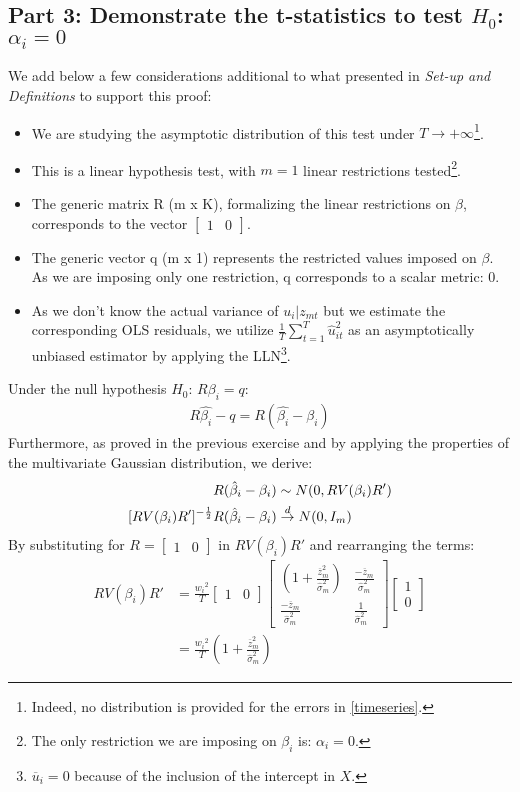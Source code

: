 \documentclass[]{article}
\begin{document}
\subsection{Part 3: Demonstrate the t-statistics to test $H_0$: $\alpha_i = 0 $}
We add below a few considerations additional to what presented in \textit{Set-up and Definitions} to support this proof:
\begin{itemize}
	\item We are studying the asymptotic distribution of this test under $T \to +\infty$\footnote{Indeed, no distribution is provided for the errors in \ref{timeseries}.}.	
	\item This is a linear hypothesis test, with $m = 1$ linear restrictions tested\footnote{The only restriction we are imposing on $\beta_i$ is: $\alpha_i = 0 $.}.
	\item The generic matrix R (m x K), formalizing the linear restrictions on $\beta$, corresponds to the vector $\begin{bmatrix} 1 & 0 \end{bmatrix}$.
	\item The generic vector q (m x 1) represents the restricted values imposed on $\beta$. As we are imposing only one restriction, q corresponds to a scalar metric: 0.
	\item As we don't know the actual variance of $u_i|z_{mt}$ but we estimate the corresponding OLS residuals, we utilize $\frac{1}{T}\sum_{t=1}^{T}\hat{u}_{it}^2$ as an asymptotically unbiased estimator by applying the LLN\footnote{$\overline{u}_i = 0$ because of the inclusion of the intercept in $X$.}.
\end{itemize}
Under the null hypothesis $H_0$: $R\beta_i=q$:
\begin{align*}
	R\hat{\beta_i}-q = R(\hat{\beta_i} - \beta_i)
\end{align*}
Furthermore, as proved in the previous exercise and by applying the properties of the multivariate Gaussian distribution, we derive:
\begin{align} \label{2.3}
	R(\hat{\beta}_i-\beta_i) &\sim N(0, RV(\beta_i)R') \notag \\
	[RV(\beta_i)R']^{-\frac{1}{2}}R(\hat{\beta}_i-\beta_i) &\overset{d}{\to} N(0,I_m)
\end{align}
By substituting for $R=\begin{bmatrix} 1 & 0 \end{bmatrix}$ in $RV(\beta_i)R'$ and rearranging the terms:
\begin{align*}
	RV(\beta_i)R' &= \frac{w_i{^2}}{T} \begin{bmatrix} 1 & 0 \end{bmatrix} \begin{bmatrix} (1 + \frac{\overline{z}_m^2}{\hat{\sigma}_{m}^2}) & \frac{-\overline{z}_m}{\hat{\sigma}_{m}^2} \\ \frac{-\overline{z}_m}{\hat{\sigma}_{m}^2} & \frac{1}{\hat{\sigma}_{m}^2} \end{bmatrix} \begin{bmatrix} 1 \\ 0 \end{bmatrix} \\
	&= \frac{w_i{^2}}{T}(1 + \frac{\overline{z}_m^2}{\hat{\sigma}_{m}^2})
\end{align*}
\end{document}
